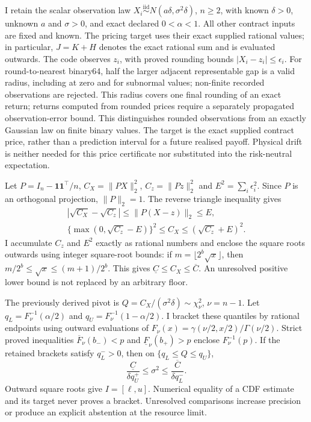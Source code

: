 \documentclass[11pt]{article}
\begin{document}
I retain the scalar observation law
$X_i\overset{\mathrm{iid}}\sim N(a\delta,\sigma^2\delta)$, $n\geq2$,
with known $\delta>0$, unknown $a$ and $\sigma>0$, and exact declared
$0<\alpha<1$. All other contract inputs are fixed and known. The pricing
target uses their exact supplied rational values; in particular,
$J=K+H$ denotes the exact rational sum and is evaluated outwards. The code observes $z_i$, with proved
rounding bounds $|X_i-z_i|\leq\epsilon_i$. For round-to-nearest binary64,
half the larger adjacent representable gap is a valid radius, including
at zero and for subnormal values; non-finite recorded observations are
rejected. This radius covers one final rounding of an exact return;
returns computed from rounded prices require a separately propagated
observation-error bound. This distinguishes rounded observations from an exactly
Gaussian law on finite binary values.
The target is the exact supplied contract price, rather than a prediction
interval for a future realised payoff. Physical drift is neither needed
for this price certificate nor substituted into the risk-neutral
expectation.

Let $P=I_n-\mathbf1\mathbf1^\top/n$,
$C_X=\|PX\|_2^2$, $C_z=\|Pz\|_2^2$ and
$E^2=\sum_i\epsilon_i^2$. Since $P$ is an orthogonal projection,
$\|P\|_2=1$. The reverse triangle inequality gives
\begin{equation}
 \begin{gathered}
 |\sqrt{C_X}-\sqrt{C_z}|\leq\|P(X-z)\|_2\leq E,\\
 \{\max(0,\sqrt{C_z}-E)\}^2\leq C_X
 \leq(\sqrt{C_z}+E)^2.
 \end{gathered}
 \label{eq:cgbm-rounded-scatter}
\end{equation}
I accumulate $C_z$ and $E^2$ exactly as rational numbers and enclose the
square roots outwards using integer square-root bounds: if
$m=\lfloor 2^b\sqrt{x}\rfloor$, then
$m/2^b\leq\sqrt{x}\leq(m+1)/2^b$. This gives $\underline C\leq C_X\leq\overline C$.
An unresolved positive lower bound is not replaced by an arbitrary floor.

The previously derived pivot is
$Q=C_X/(\sigma^2\delta)\sim\chi^2_\nu$, $\nu=n-1$.
Let $q_L=F_\nu^{-1}(\alpha/2)$ and
$q_U=F_\nu^{-1}(1-\alpha/2)$. I bracket these quantiles by rational
endpoints using outward evaluations of
$F_\nu(x)=\gamma(\nu/2,x/2)/\Gamma(\nu/2)$.
Strict proved inequalities $\overline F_\nu(b_-)<p$
and $\underline F_\nu(b_+)>p$ enclose $F_\nu^{-1}(p)$.
If the retained brackets satisfy $q_L^->0$, then on
$\{q_L\leq Q\leq q_U\}$,
\begin{equation}
 \frac{\underline C}{\delta q_U^+}\leq\sigma^2\leq
 \frac{\overline C}{\delta q_L^-}.
 \label{eq:cgbm-validated-variance}
\end{equation}
Outward square roots give $I=[\ell,u]$. Numerical equality of a CDF
estimate and its target never proves a bracket. Unresolved comparisons
increase precision or produce an explicit abstention at the resource
limit.
\end{document}
